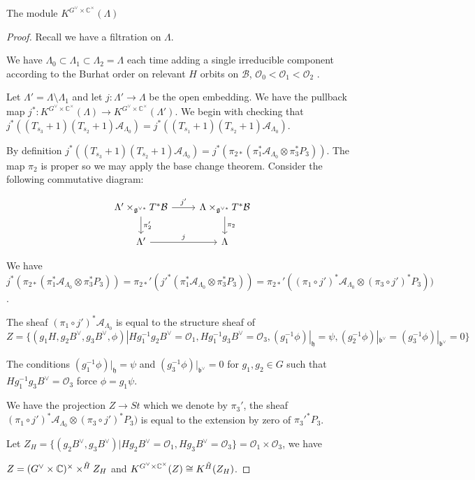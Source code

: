 \documentclass[12pt]{article}
\newcommand{\A}{\mathcal{A}}
\newcommand{\B}{\mathcal{B}}
\newcommand{\C}{\mathbb{C}}
\newcommand{\s}{\mathcal{O}}
\newcommand{\<}{\langle}
\renewcommand{\>}{\rangle}
\theoremstyle{plain}
\theoremstyle{definition}
\begin{document}
\begin{section}{The module $K^{G^\vee\times \C^\times}(\Lambda)$}
\begin{proof}
    Recall we have a filtration on $\Lambda$. 
    
    We have $\Lambda_0\subset \Lambda_1\subset \Lambda_2=\Lambda$ each time adding a single irreducible component according to the Burhat order on relevant $H$ orbits on $\B$, $\s_0<\s_1<\s_2$ . 
    
    Let $\Lambda'=\Lambda\setminus\Lambda_1$ and let $j:\Lambda'\rightarrow\Lambda$ be the open embedding. We have the pullback map $j^*:K^{G^\vee\times\C^\times}(\Lambda)\rightarrow K^{G^\vee\times\C^\times}(\Lambda')$. We begin with checking that $j^*((T_{s_{3}}+1)(T_{s_{2}}+1)\A_{\Lambda_0})=j^*((T_{s_{1}}+1)(T_{s_{2}}+1)\A_{\Lambda_0})$.

    By definition $j^*((T_{s_{3}}+1)(T_{s_{2}}+1)\A_{\Lambda_0})=j^*(\pi_{2*}(\pi_1^*\A_{\Lambda_0}\otimes \pi_3^*P_3))$. The map $\pi_2$ is proper so we may apply the base change theorem. Consider the following commutative diagram:

    \[
    \begin{tikzcd}
\Lambda'\times_{\mathfrak{g}^{\vee*}} T^*\B 
    \arrow[r,"j'"] 
    \arrow[d,"\pi_2'"] &
\Lambda\times_{\mathfrak{g}^{\vee*}} T^*\B
    \arrow[d,"\pi_2"] \\
\Lambda'
    \arrow[r, "j"] 
& \Lambda
\end{tikzcd}
\]

We have $j^*(\pi_{2*}(\pi_1^*\A_{\Lambda_0}\otimes \pi_3^*P_3))=\pi_{2*}'(j'^*(\pi_1^*\A_{\Lambda_0}\otimes \pi_3^*P_3))=\pi_{2*}'((\pi_1\circ j')^*\A_{\Lambda_0}\otimes (\pi_3\circ j')^*P_3))$.

The sheaf $(\pi_1\circ j')^*\A_{\Lambda_0}$ is equal to the structure sheaf of $$Z=\{(g_1H,g_2B^\vee,g_3B^\vee,\phi)|Hg_1^{-1}g_2B^\vee=\s_1,Hg_1^{-1}g_3B^\vee=\s_3,(g^{-1}_1\phi)|_\mathfrak{h}=\psi,(g^{-1}_2\phi)|_\mathfrak{b^\vee}=(g^{-1}_3\phi)|_\mathfrak{b^\vee}=0\}$$

The conditions $(g^{-1}_1\phi)|_\mathfrak{h}=\psi$ and $(g^{-1}_3\phi)|_\mathfrak{b^\vee}=0$ for $g_1,g_2\in G$ such that $Hg_1^{-1}g_3B^\vee=\s_3$ force $\phi=g_1\psi$.  

We have the projection $Z\rightarrow St$ which we denote by $\pi_3'$, the sheaf $(\pi_1\circ j')^*\A_{\Lambda_0}\otimes (\pi_3\circ j')^*P_3)$ is equal to the extension by zero of $\pi_3'^*P_3$. 


Let $Z_H=\{(g_2B^\vee,g_3B^\vee)|Hg_2B^\vee=\s_1,Hg_3B^\vee=\s_3\}=\s_1\times\s_3$, we have 

$Z=(G^\vee\times\C)^\times\times^{\Tilde{H}}Z_H$ and $K^{G^\vee\times\C^\times}(Z)\cong K^{\Tilde{H}}(Z_H)$.


\end{proof}
\end{section}
\end{document}
